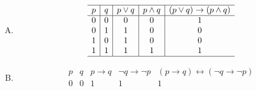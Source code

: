 {{\begin{practices}
\begin{enumerate}[A.]
{\begin{table}[H]
                        \[
                            \begin{array}{c|c|c|c|c}
                                \hline
                                p & q & \neg q & p \vee \neg q & p \vee \neg q \rightarrow q \\
                                \hline
                                0 & 0 & 1 & 1 & 0 \\
                                0 & 1 & 0 & 0 & 1 \\
                                1 & 0 & 1 & 1 & 0 \\
                                1 & 1 & 0 & 1 & 1 \\
                                \hline
                            \end{array}
                        \]
                    \end{table}
                }
                \item
                {
                    \begin{table}[H]
                        \[
                            \begin{array}{c|c|c|c|c}
                                \hline
                                p & q & p \vee q & p \wedge q & (p \vee q) \rightarrow (p \wedge q) \\
                                \hline
                                0 & 0 & 0 & 0 & 1 \\
                                0 & 1 & 1 & 0 & 0 \\
                                1 & 0 & 1 & 0 & 0 \\
                                1 & 1 & 1 & 1 & 1 \\
                                \hline
                            \end{array}
                        \]
                    \end{table}
                }
                \item
                {
                    \begin{table}[H]
                        \[
                            \begin{array}{c|c|c|c|c}
                                \hline
                                p & q & p \rightarrow q & \neg q \rightarrow \neg p & (p \rightarrow q) \leftrightarrow (\neg q \rightarrow \neg p) \\
                                \hline
                                0 & 0 & 1 & 1 & 1 \\

\end{array}\]
\end{table}}
\end{enumerate}
\end{practices}}}
